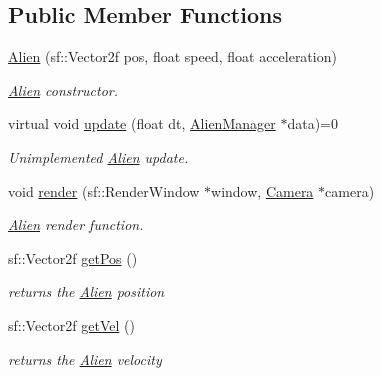 \subsection*{Public Member Functions}
\begin{DoxyCompactItemize}
\item 
\mbox{\label{class_alien_a0ac76d63046eed42f2581cb5ec3a493b}} 
\hyperlink{class_alien_a0ac76d63046eed42f2581cb5ec3a493b}{Alien} (sf\+::\+Vector2f pos, float speed, float acceleration)
\begin{DoxyCompactList}\small\item\em \hyperlink{class_alien}{Alien} constructor. \end{DoxyCompactList}\item 
virtual void \hyperlink{class_alien_afdf9627be2ad37372174a250540dd47b}{update} (float dt, \hyperlink{class_alien_manager}{Alien\+Manager} $\ast$data)=0
\begin{DoxyCompactList}\small\item\em Unimplemented \hyperlink{class_alien}{Alien} update. \end{DoxyCompactList}\item 
void \hyperlink{class_alien_a8d407e6ec7a582cefe9d7e37b1b3b063}{render} (sf\+::\+Render\+Window $\ast$window, \hyperlink{class_camera}{Camera} $\ast$camera)
\begin{DoxyCompactList}\small\item\em \hyperlink{class_alien}{Alien} render function. \end{DoxyCompactList}\item 
\mbox{\label{class_alien_aa9aefdfec02345614bca8ad45779df49}} 
sf\+::\+Vector2f \hyperlink{class_alien_aa9aefdfec02345614bca8ad45779df49}{get\+Pos} ()
\begin{DoxyCompactList}\small\item\em returns the \hyperlink{class_alien}{Alien} position \end{DoxyCompactList}\item 
\mbox{\label{class_alien_adeddf8c801bcd1c0e18d3bd5323cb287}} 
sf\+::\+Vector2f \hyperlink{class_alien_adeddf8c801bcd1c0e18d3bd5323cb287}{get\+Vel} ()
\begin{DoxyCompactList}\small\item\em returns the \hyperlink{class_alien}{Alien} velocity \end{DoxyCompactList}\item 

\end{DoxyCompactItemize}
